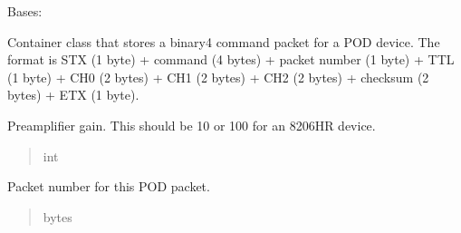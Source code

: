 \documentclass[letterpaper,10pt,english]{sphinxmanual}
\begin{document}
\begin{fulllineitems}
\label{\detokenize{PodApi.Packets:PodApi.Packets.Binary4.PacketBinary4}}
\pysigstartsignatures
{}
\pysigstopsignatures
\sphinxAtStartPar
Bases: {\hyperref[\detokenize{PodApi.Packets:PodApi.Packets.Packet.Packet}]{}}

\sphinxAtStartPar
Container class that stores a binary4 command packet for a POD device. The format is     STX (1 byte) + command (4 bytes) + packet number (1 byte) + TTL (1 byte) +     CH0 (2 bytes) + CH1 (2 bytes) + CH2 (2 bytes) + checksum (2 bytes) + ETX (1 byte).

\begin{fulllineitems}
\label{\detokenize{PodApi.Packets:PodApi.Packets.Binary4.PacketBinary4._preampGain}}
\pysigstartsignatures
{}
\pysigstopsignatures
\sphinxAtStartPar
Preamplifier gain. This should be 10 or 100 for an 8206\sphinxhyphen{}HR device.
\begin{quote}\begin{description}
\sphinxAtStartPar
int

\end{description}\end{quote}

\end{fulllineitems}


\begin{fulllineitems}
\label{\detokenize{PodApi.Packets:PodApi.Packets.Binary4.PacketBinary4.packetNumber}}
\pysigstartsignatures
{}
\pysigstopsignatures
\sphinxAtStartPar
Packet number for this POD packet.
\begin{quote}\begin{description}
\sphinxAtStartPar
bytes


\end{description}
\end{quote}
\end{fulllineitems}
\end{fulllineitems}
\end{document}
